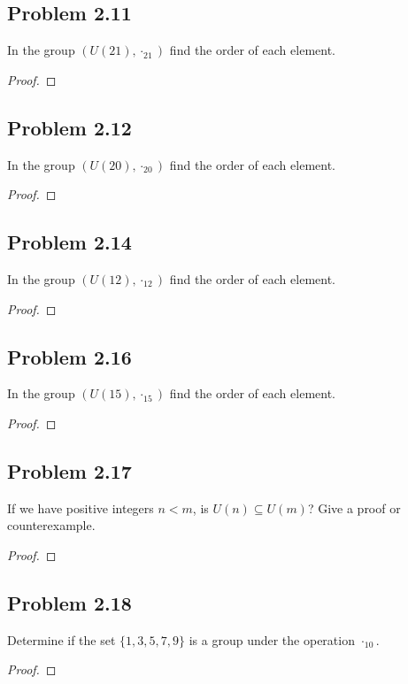 \documentclass{amsbook}
\begin{document}
			\subsection*{Problem 2.11}
			\label{sub:problem_2_11}
			In the group $(U(21), \cdot_{21})$ find the order of each element.
			\begin{proof}
			\end{proof}

			\subsection*{Problem 2.12}
			\label{sub:problem_2_12}
			In the group $(U(20), \cdot_{20})$ find the order of each element.
			\begin{proof}
			\end{proof}

			\subsection*{Problem 2.14}
			\label{sub:problem_2_14}
			In the group $(U(12), \cdot_{12})$ find the order of each element.
			\begin{proof}
			\end{proof}

			\subsection*{Problem 2.16}
			\label{sub:problem_2_16}
			In the group $(U(15), \cdot_{15})$ find the order of each element.
			\begin{proof}
			\end{proof}

			\subsection*{Problem 2.17}
			\label{sub:problem_2_17}
			If we have positive integers $n < m$, is $U(n) \subseteq U(m)$?
			Give a proof or counterexample.
			\begin{proof}
			\end{proof}

			\subsection*{Problem 2.18}
			\label{sub:problem_2_18}
			Determine if the set $\{1,3,5,7,9\}$ is a group under the operation $\cdot_{10}$.
			\begin{proof}
			\end{proof}
\end{document}
